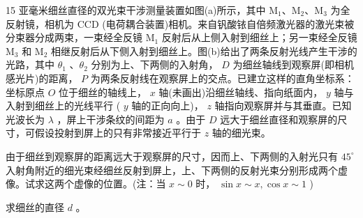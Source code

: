\begin{problem}[第30届全国中学生物理竞赛决赛][亚毫米细丝双光束干涉测径]{15}
亚毫米细丝直径的双光束干涉测量装置如图(a)所示，其中 $\mathrm{M}_{1} 、 \mathrm{M}_{2} 、 \mathrm{M}_{3}$ 为全反射镜，相机为 CCD (电荷耦合装置)相机。来自钒酸铱自倍频激光器的激光束被分束器分成两束，一束经全反镜 $\mathrm{M}_{1}$ 反射后从上侧入射到细丝上；另一束经全反镜 $\mathrm{M}_{3}$ 和 $\mathrm{M}_{2}$ 相继反射后从下侧入射到细丝上。图(b)给出了两条反射光线产生干涉的光路，其中 $\theta_{1}$ 、$ \theta_{2}$ 分别为上、下两侧的入射角， $D$ 为细丝轴线到观察屏(即相机感光片)的距离， $P$ 为两条反射线在观察屏上的交点。已建立这样的直角坐标系：坐标原点 $O$ 位于细丝的轴线上， $x$ 轴(未画出)沿细丝轴线、指向纸面内， $y$ 轴与入射到细丝上的光线平行 ( $y$ 轴的正向向上)， $z$ 轴指向观察屏并与其垂直。已知光波长为 $\lambda$ ，屏上干涉条纹的间距为 $a$ 。由于 $D$ 远大于细丝直径和观察屏的尺寸，可假设投射到屏上的只有非常接近平行于 $z$ 轴的细光束。
\begin{subproblem}
由于细丝到观察屏的距离远大于观察屏的尺寸，因而上、下两侧的入射光只有 $45^{\circ}$ 入射角附近的细光束经细丝反射到屏上，上、下两侧的反射光束分别形成两个虚像。试求这两个虚像的位置。(注：当 $x \sim 0$ 时， $\sin x \sim x, \cos x \sim 1$ )
\end{subproblem}
\begin{subproblem}
求细丝的直径 $d$ 。
\end{subproblem}
\end{problem}